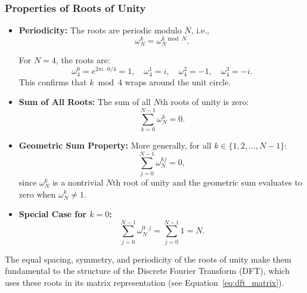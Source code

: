 \subsubsection*{Properties of Roots of Unity}

\begin{itemize}
    \item \textbf{Periodicity:} The roots are periodic modulo $N$, i.e.,
    \begin{equation}
        \omega_N^k = \omega_N^{k \bmod N}.
        \label{eq:periodicity}
    \end{equation}
    \begin{example}
        For $N = 4$, the roots are:
        \[
        \omega_4^0 = e^{2\pi\iota \cdot 0 / 4} = 1, \quad \omega_4^1 = i, \quad \omega_4^2 = -1, \quad \omega_4^3 = -i.
        \]
        This confirms that $k \bmod 4$ wraps around the unit circle.
    \end{example}
    
    \item \textbf{Sum of All Roots:} The sum of all $N$th roots of unity is zero:
    \begin{equation}
        \sum_{k=0}^{N-1} \omega_N^k = 0.
        \label{eq:roots_sum}
    \end{equation}
    
    \item \textbf{Geometric Sum Property:} More generally, for all $k \in \{1,2,\dots,N-1\}$:
    \begin{equation}
        \sum_{j=0}^{N-1} \omega_N^{kj} = 0,
        \label{eq:sum_powers_of_omega}
    \end{equation}
    since $\omega_N^k$ is a nontrivial $N$th root of unity and the geometric sum evaluates to zero when $\omega_N^k \neq 1$.
    
    \item \textbf{Special Case for $k = 0$:}
    \begin{equation}
        \sum_{j=0}^{N-1} \omega_N^{0 \cdot j} = \sum_{j=0}^{N-1} 1 = N.
        \label{eq:trivial_sum}
    \end{equation}
\end{itemize}

\begin{remark}
The equal spacing, symmetry, and periodicity of the roots of unity make them fundamental to the structure of the Discrete Fourier Transform (DFT), which uses these roots in its matrix representation (see Equation~\eqref{eq:dft_matrix}).
\end{remark}

